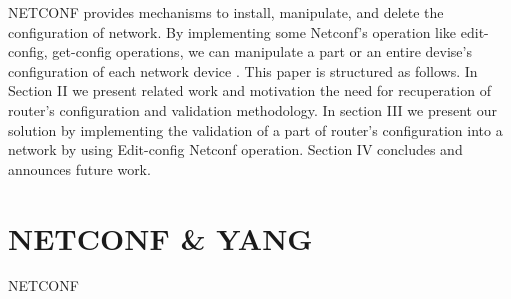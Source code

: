 \documentclass[10pt,conference]{IEEEtran}
\begin{document}
NETCONF provides mechanisms to install, manipulate, and delete the configuration of network. By implementing some Netconf’s operation like edit-config, get-config  operations, we can manipulate a part or an entire devise’s configuration of each network device  \cite{DBLP:conf/infocom/Enns2011}.
This paper is structured as follows. In Section II we present related work and motivation the need for recuperation of router’s configuration and validation methodology. In section III we present our solution by implementing the validation of a part of router’s configuration into a network by using Edit-config Netconf operation. Section IV concludes and announces future work.  




% 
%






\section{NETCONF \& YANG} %
NETCONF
\end{document}
